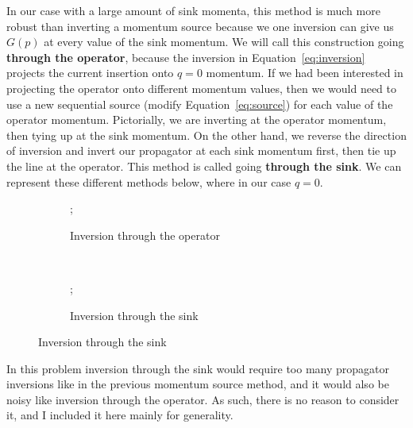 \documentclass[11pt, oneside]{article}   	%
\theoremstyle{definition}
\begin{document}
In our case with a large amount of sink momenta, this method is much more robust than inverting a momentum source 
because we one inversion can give us $G(p)$ at every value of the sink momentum. We will call this construction going 
\textbf{through the operator}, because the inversion in Equation~\ref{eq:inversion} projects the current insertion onto $q = 0$ 
momentum. If we had been interested in projecting the operator onto different momentum values, then we would need to use a 
new sequential source (modify Equation~\ref{eq:source}) for each value of the operator momentum. Pictorially, we are 
inverting at the operator momentum, then tying up at the sink momentum. On the other hand, we reverse the direction of 
inversion and invert our propagator at each sink momentum first, then tie up the line at the operator. This method is called 
going \textbf{through the sink}. We can represent these different methods below, where in our case $q = 0$. 
\begin{figure}[H]
	\centering
	\begin{subfigure}[t]{.48\textwidth}
	\centering
		;
            	\caption{Inversion through the operator}
	\end{subfigure}
	~
	\begin{subfigure}[t]{.48\textwidth}
	\centering
		;
            	\caption{Inversion through the sink}
	\end{subfigure}
\end{figure}

In this problem inversion through the sink would require too many propagator inversions like in the previous momentum 
source method, and it would also be noisy like inversion through the operator. As such, there is no reason to consider it, 
and I included it here mainly for generality. 
\end{document}

